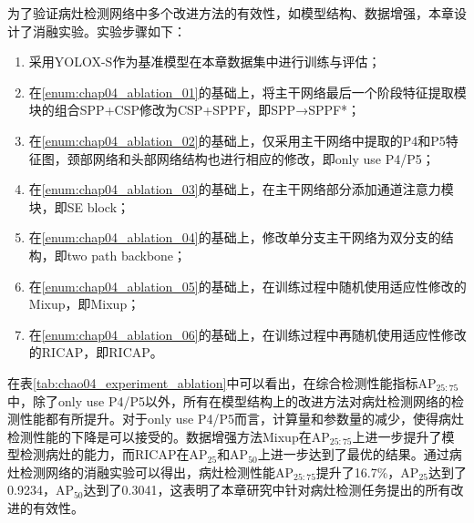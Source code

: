 为了验证病灶检测网络中多个改进方法的有效性，如模型结构、数据增强，本章设计了消融实验。实验步骤如下：
\begin{enumerate}[(1)]
  \item 采用YOLOX-S作为基准模型在本章数据集中进行训练与评估；\label{enum:chap04_ablation_01}
  \item 在\ref{enum:chap04_ablation_01}的基础上，将主干网络最后一个阶段特征提取模块的组合SPP+CSP修改为CSP+SPPF，即SPP→SPPF*；\label{enum:chap04_ablation_02}
  \item 在\ref{enum:chap04_ablation_02}的基础上，仅采用主干网络中提取的P4和P5特征图，颈部网络和头部网络结构也进行相应的修改，即only use P4/P5；\label{enum:chap04_ablation_03}
  \item 在\ref{enum:chap04_ablation_03}的基础上，在主干网络部分添加通道注意力模块，即SE block；\label{enum:chap04_ablation_04}
  \item 在\ref{enum:chap04_ablation_04}的基础上，修改单分支主干网络为双分支的结构，即two path backbone；\label{enum:chap04_ablation_05}
  \item 在\ref{enum:chap04_ablation_05}的基础上，在训练过程中随机使用适应性修改的Mixup，即Mixup；\label{enum:chap04_ablation_06}
  \item 在\ref{enum:chap04_ablation_06}的基础上，在训练过程中再随机使用适应性修改的RICAP，即RICAP。
\end{enumerate}

在表\ref{tab:chao04_experiment_ablation}中可以看出，在综合检测性能指标AP\(_{25:75}\)中，除了only use P4/P5以外，所有在模型结构上的改进方法对病灶检测网络的检测性能都有所提升。对于only use P4/P5而言，计算量和参数量的减少，使得病灶检测性能的下降是可以接受的。数据增强方法Mixup在AP\(_{25:75}\)上进一步提升了模型检测病灶的能力，而RICAP在AP\(_{25}\)和AP\(_{50}\)上进一步达到了最优的结果。通过病灶检测网络的消融实验可以得出，病灶检测性能AP\(_{25:75}\)提升了16.7\%，AP\(_{25}\)达到了0.9234，AP\(_{50}\)达到了0.3041，这表明了本章研究中针对病灶检测任务提出的所有改进的有效性。

